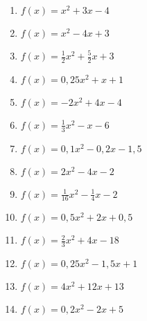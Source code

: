 \begin{Exercise}[title={Bestimme die Nullstellen}, label=normalformNullstellenA1]

	\begin{minipage}{\textwidth}
		\begin{minipage}{0.49\textwidth}
			\begin{enumerate}[label=\alph*)]
				\item \(f(x)=x^2+3x-4\)
				\item \(f(x)=x^2-4x+3\)
				\item \(f(x)=\frac{1}{2}x^2+\frac{5}{2}x+3\)
				\item \(f(x)=0,25x^2+x+1\)
				\item \(f(x)=-2x^2+4x-4\)
				\item \(f(x)=\frac{1}{3}x^2-x-6\)
				\item \(f(x)=0,1x^2-0,2x-1,5\)
			\end{enumerate}
		\end{minipage}
		\begin{minipage}{0.49\textwidth}
			\begin{enumerate}[label=\alph*)]
				\setcounter{enumi}{7}
				\item \(f(x)=2x^2-4x-2\)
				\item \(f(x)=\frac{1}{16}x^2-\frac{1}{4}x-2\)
				\item \(f(x)=0,5x^2+2x+0,5\)
				\item \(f(x)=\frac{2}{3}x^2+4x-18\)
				\item \(f(x)=0,25x^2-1,5x+1\)
				\item \(f(x)=4x^2+12x+13\)
				\item \(f(x)=0,2x^2-2x+5\)
			\end{enumerate}
		\end{minipage}
	\end{minipage}
\end{Exercise}

